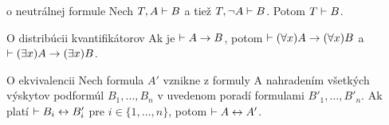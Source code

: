 \begin{lema}{o neutrálnej formule}
   Nech $T,A \vdash B$ a tiež $T, \neg A \vdash B$. Potom
   $T \vdash B$.
\end{lema}

\begin{lema}{O distribúcii kvantifikátorov}
    Ak je $\vdash A \rightarrow B$, potom
    $\vdash (\forall x)A \rightarrow (\forall x) B$ a
    $\vdash (\exists x)A \rightarrow (\exists x)B$.
\end{lema}

\begin{veta}{O ekvivalencii}
    Nech formula $A'$ vznikne z formuly A nahradením všetkých výskytov 
    podformúl $B_1,\dots ,B_n$ v uvedenom poradí formulami 
    $B'_1, \dots, B'_n$. Ak platí $\vdash B_i \leftrightarrow B'_i$ pre
    $i \in \{1,\dots,n\}$, potom $\vdash A \leftrightarrow A'$.
\end{veta}
